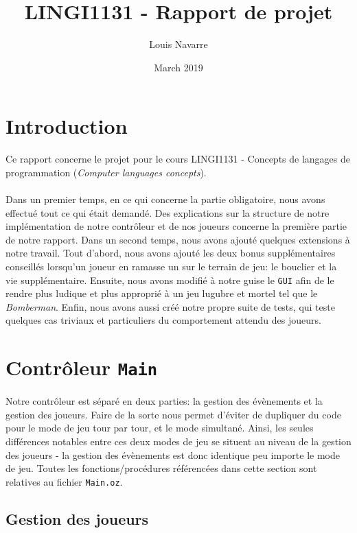 \documentclass{article}
\title{LINGI1131 - Rapport de projet}
\author{Louis Navarre}
\date{March 2019}
\begin{document}
\maketitle

\section{Introduction}
Ce rapport concerne le projet pour le cours LINGI1131 - Concepts de langages de programmation (\emph{Computer languages concepts}). \\ \\
Dans un premier temps, en ce qui concerne la partie obligatoire, nous avons effectué tout ce qui était demandé. Des explications sur la structure de notre implémentation de notre contrôleur et de nos joueurs concerne la première partie de notre rapport. Dans un second temps, nous avons ajouté quelques extensions à notre travail. Tout d'abord, nous avons ajouté les deux bonus supplémentaires conseillés lorsqu'un joueur en ramasse un sur le terrain de jeu: le bouclier et la vie supplémentaire. Ensuite, nous avons modifié à notre guise le \texttt{GUI} afin de le rendre plus ludique et plus approprié à un jeu lugubre et mortel tel que le \emph{Bomberman}. Enfin, nous avons aussi créé notre propre suite de tests, qui teste quelques cas triviaux et particuliers du comportement attendu des joueurs.

\section{Contrôleur \texttt{Main}}
Notre contrôleur est séparé en deux parties: la gestion des évènements et la gestion des joueurs. Faire de la sorte nous permet d'éviter de dupliquer du code pour le mode de jeu tour par tour, et le mode simultané. Ainsi, les seules différences notables entre ces deux modes de jeu se situent au niveau de la gestion des joueurs - la gestion des évènements est donc identique peu importe le mode de jeu. Toutes les fonctions/procédures référencées dans cette section sont relatives au fichier \texttt{Main.oz}.
\subsection{Gestion des joueurs}
\end{document}
